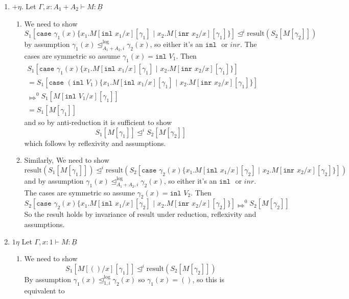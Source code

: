\documentclass[acmsmall,screen,12pt]{acmart}
\renewcommand{\u}{\underline}
\newcommand{\pipe}{\,\,|\,\,}
\newcommand{\apreorder}{\trianglelefteq}
\newcommand{\ix}[2]{\mathrel{#1^{#2}}}
\newcommand{\itylrof}[3]{\ilrof{#1}{#3,#2}}
\newcommand{\ilrof}[2]{\mathrel{{#1}^{\text{log}}_{#2}}}
\newcommand{\itylr}[2]{\itylrof{\apreorder}{#1}{#2}}
\newcommand{\bigstepsin}[1]{\mathrel{\Mapsto^{#1}}}
\newcommand{\inl}{\kw{inl}}
\newcommand{\inr}{\kw{inr}}
\newcommand{\result}{\text{result}}
\newcommand{\case}{\kw{case}}
\newcommand{\kw}[1]{\texttt{#1}\,\,}
\newcommand{\caseofXthenYelseZ}[3]{\case #1 \{ #2 \pipe #3 \}}
\begin{document}
{\begin{longproof}
\begin{enumerate}
\begin{enumerate}
      By assumption $\gamma_1(x) \itylr i 0 \gamma_2(x)$ but this is a contradiction
    \item Other direction is the same contradiction.
    \end{enumerate}
  \item $+\eta$. Let $\Gamma , x:A_1 + A_2 \vdash M : \u B$
    \begin{enumerate}
    \item We need to show
      \[ S_1[\caseofXthenYelseZ {\gamma_1(x)} {x_1. M[\inl x_1/x][\gamma_1]}{x_2. M[\inr x_2/x][\gamma_1]}]
      \ix\apreorder i \result(S_2[M[\gamma_2]]) \] by assumption
      $\gamma_1(x) \itylr i {A_1 + A_2} \gamma_2(x)$, so either it's
      an $\inl$ or $inr$. The cases are symmetric so assume
      $\gamma_1(x) = \inl V_1$.
      Then
      \begin{align*}
         S_1[\caseofXthenYelseZ {\gamma_1(x)} {x_1. M[\inl x_1/x][\gamma_1]}{x_2. M[\inr x_2/x][\gamma_1]}]\\
         =S_1[\caseofXthenYelseZ {(\inl V_1)} {x_1. M[\inl x_1/x][\gamma_1]}{x_2. M[\inr x_2/x][\gamma_1]}]\\
         \bigstepsin{0} S_1[M[\inl V_1/x][\gamma_1]]\\
         = S_1[M[\gamma_1]]
      \end{align*}
      and so by anti-reduction it is sufficient to show
      \[ S_1[M[\gamma_1]] \ix\apreorder i S_2[M[\gamma_2]]\]
      which follows by reflexivity and assumptions.
    \item Similarly, We need to show
      \[
      \result(S_1[M[\gamma_1]])
      \ix\apreorder i
      \result(S_2[\caseofXthenYelseZ {\gamma_2(x)} {x_1. M[\inl x_1/x][\gamma_2]}{x_2. M[\inr x_2/x][\gamma_2]}])
      \]
      and by assumption $\gamma_1(x) \itylr i {A_1 + A_2}
      \gamma_2(x)$, so either it's an $\inl$ or $inr$. The cases are
      symmetric so assume $\gamma_2(x) = \inl V_2$.
      Then
      \[ S_2[\caseofXthenYelseZ {\gamma_2(x)} {x_1. M[\inl x_1/x][\gamma_2]}{x_2. M[\inr x_2/x][\gamma_2]}] \bigstepsin{0}
      S_2[M[\gamma_2]]
      \]
      So the result holds by invariance of result under reduction,
      reflexivity and assumptions.
    \end{enumerate}
  \item $1\eta$ Let $\Gamma, x : 1 \vdash M : \u B$
    \begin{enumerate}
    \item We need to show
      \[ S_1[M[()/x][\gamma_1]] \ix\apreorder i \result(S_2[M[\gamma_2]])\]
      By assumption $\gamma_1(x) \itylr i 1 \gamma_2(x)$ so $\gamma_1(x) = ()$, so this is equivalent to 

\end{enumerate}
\end{enumerate}
\end{longproof}}
\end{document}

